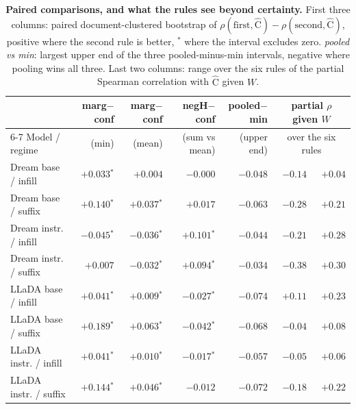 \begin{table}[!ht]
\centering
\footnotesize
\setlength{\tabcolsep}{3.5pt}
\begin{tabular}{lrrrrrr}
\toprule
 & marg$-$conf & marg$-$conf & negH$-$conf & pooled$-$min & \multicolumn{2}{c}{partial $\rho$ given $W$} \\
\cmidrule(lr){6-7}
Model / regime & (min) & (mean) & (sum vs mean) & (upper end) & \multicolumn{2}{c}{over the six rules} \\
\midrule
Dream base / infill & $+0.033$$^{*}$ & $+0.004$ & $-0.000$ & $-0.048$ & $-0.14$ & $+0.04$ \\
Dream base / suffix & $+0.140$$^{*}$ & $+0.037$$^{*}$ & $+0.017$ & $-0.063$ & $-0.28$ & $+0.21$ \\
Dream instr. / infill & $-0.045$$^{*}$ & $-0.036$$^{*}$ & $+0.101$$^{*}$ & $-0.044$ & $-0.21$ & $+0.28$ \\
Dream instr. / suffix & $+0.007$ & $-0.032$$^{*}$ & $+0.094$$^{*}$ & $-0.034$ & $-0.38$ & $+0.30$ \\
LLaDA base / infill & $+0.041$$^{*}$ & $+0.009$$^{*}$ & $-0.027$$^{*}$ & $-0.074$ & $+0.11$ & $+0.23$ \\
LLaDA base / suffix & $+0.189$$^{*}$ & $+0.063$$^{*}$ & $-0.042$$^{*}$ & $-0.068$ & $-0.04$ & $+0.08$ \\
LLaDA instr. / infill & $+0.041$$^{*}$ & $+0.010$$^{*}$ & $-0.017$$^{*}$ & $-0.057$ & $-0.05$ & $+0.06$ \\
LLaDA instr. / suffix & $+0.144$$^{*}$ & $+0.046$$^{*}$ & $-0.012$ & $-0.072$ & $-0.18$ & $+0.22$ \\
\bottomrule
\end{tabular}
\caption{\textbf{Paired comparisons, and what the rules see beyond certainty.} First three
columns: paired document-clustered bootstrap of
$\rho(\text{first},\widehat{\mathrm{C}})-\rho(\text{second},\widehat{\mathrm{C}})$,
positive where the second rule is better, $^{*}$ where the interval excludes zero.
\emph{pooled vs min}: largest upper end of the three pooled-minus-min intervals, negative
where pooling wins all three. Last two columns: range over the six rules of the partial
Spearman correlation with $\widehat{\mathrm{C}}$ given $W$.}\label{tab:paired}
\end{table}
